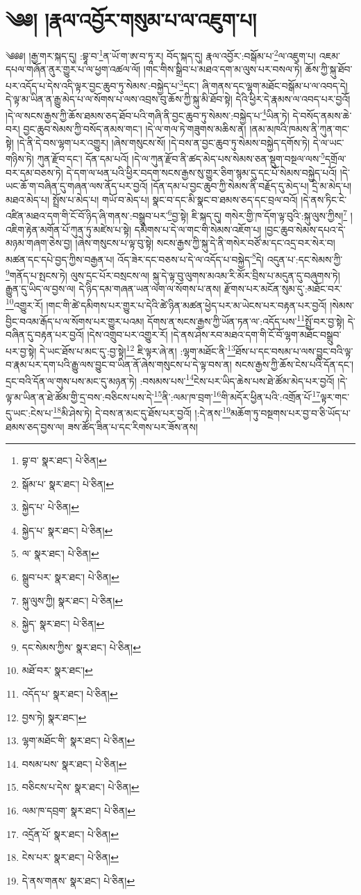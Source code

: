 \setcounter{footnote}{0} 
\chapter{༄༅། །རྣལ་འབྱོར་གསུམ་པ་ལ་འཇུག་པ།}༄༅༅། །རྒྱ་གར་སྐད་དུ། :བྷཱ་བ་\footnote{བྷ་བ་  སྣར་ཐང་།  པེ་ཅིན། }ན་ཡོ་ག་ཨ་བ་ཏཱ་ར། བོད་སྐད་དུ། རྣལ་འབྱོར་:བསྒོམ་པ་\footnote{སྒོམ་པ་  སྣར་ཐང་།  པེ་ཅིན། }ལ་འཇུག་པ། འཇམ་དཔལ་གཞོན་ནུར་གྱུར་པ་ལ་ཕྱག་འཚལ་ལོ། །གང་གིས་སྒྲིབ་པ་མཐའ་དག་མ་ལུས་པར་བསལ་ཏེ། ཆོས་ཀྱི་སྐུ་ཐོབ་པར་འདོད་པ་དེས་འདི་ལྟར་བྱང་ཆུབ་ཏུ་སེམས་:བསྐྱེད་པ་\footnote{སྐྱེད་པ་  པེ་ཅིན། }དང་། ཞི་གནས་དང་ལྷག་མཐོང་བསྒོམ་པ་ལ་འབད་དེ། དེ་ལྟ་མ་ཡིན་ན་རྒྱུ་མེད་པ་ལ་སོགས་པ་ལས་འབྲས་བུ་ཆོས་ཀྱི་སྐུ་མི་ཐོབ་སྟེ། དེའི་ཕྱིར་དེ་རྣམས་ལ་འབད་པར་བྱའོ། །དེ་ལ་སངས་རྒྱས་ཀྱི་ཆོས་ཐམས་ཅད་ཐོབ་པའི་གཞི་ནི་བྱང་ཆུབ་ཏུ་སེམས་:བསྐྱེད་པ་\footnote{སྐྱེད་པ་  སྣར་ཐང་།  པེ་ཅིན། }ཡིན་ཏེ། དེ་བསོད་ནམས་ཆེ་བར། བྱང་ཆུབ་སེམས་ཀྱི་བསོད་ནམས་གང་། །དེ་ལ་གལ་ཏེ་གཟུགས་མཆིས་ན། །ནམ་མཁའི་ཁམས་ནི་ཀུན་གང་སྟེ། །དེ་ནི་དེ་བས་ལྷག་པར་འགྱུར། །ཞེས་གསུངས་སོ། །དེ་བས་ན་བྱང་ཆུབ་ཏུ་སེམས་བསྐྱེད་དགོས་ཏེ། དེ་ལ་ཡང་གཉིས་ཏེ། ཀུན་རྫོབ་དང་། དོན་དམ་པའོ། །དེ་ལ་ཀུན་རྫོབ་ནི་ཚད་མེད་པས་སེམས་ཅན་སྡུག་བསྔལ་ལས་\footnote{ལ་  སྣར་ཐང་།  པེ་ཅིན། }དགྲོལ་བར་དམ་བཅས་ཏེ། དེ་དག་ལ་ཕན་པའི་ཕྱིར་བདག་སངས་རྒྱས་སུ་གྱུར་ཅིག་སྙམ་དུ་དང་པོ་སེམས་བསྐྱེད་པའོ། །དེ་ཡང་ཆོ་ག་བཞིན་དུ་གཞན་ལས་ནོད་པར་བྱའོ། །དོན་དམ་པ་བྱང་ཆུབ་ཀྱི་སེམས་ནི་བརྗོད་དུ་མེད་པ། དྲི་མ་མེད་པ། མཐའ་མེད་པ། སྤྲོས་པ་མེད་པ། གཡོ་བ་མེད་པ། སྣང་བ་དང་མི་སྣང་བ་ཐམས་ཅད་དང་བྲལ་བའོ། །དེ་ནས་ཏིང་ངེ་འཛིན་མཐའ་དག་གི་ངོ་བོ་ཉིད་ཞི་གནས་:བསྒྲུབ་པར་\footnote{སྒྲུབ་པར་  སྣར་ཐང་།  པེ་ཅིན། }བྱ་སྟེ། ཇི་སྐད་དུ། གསེར་གྱི་ཁ་དོག་ལྟ་བུའི་:སྐུ་ལུས་ཀྱིས།\footnote{སྐུ་ལུས་ཀྱི།  སྣར་ཐང་།  པེ་ཅིན། } །འཇིག་རྟེན་མགོན་པོ་ཀུན་ཏུ་མཛེས་པ་སྟེ། དམིགས་པ་དེ་ལ་གང་གི་སེམས་འཇོག་པ། །བྱང་ཆུབ་སེམས་དཔའ་དེ་མཉམ་གཞག་ཅེས་བྱ། །ཞེས་གསུངས་པ་ལྟ་བུ་སྟེ། སངས་རྒྱས་ཀྱི་སྐུ་དེ་ནི་གསེར་བཙོ་མ་དང་འདྲ་བར་སེར་བ། མཚན་དང་དཔེ་བྱད་ཀྱིས་བརྒྱན་པ། འོད་ཟེར་དང་བཅས་པ་དེ་ལ་འདོད་པ་བསྐྱེད་\footnote{སྐྱེད་  སྣར་ཐང་།  པེ་ཅིན། }དེ། འདུན་པ་:དང་སེམས་ཀྱི་\footnote{དང་སེམས་ཀྱིས་  སྣར་ཐང་།  པེ་ཅིན། }གནོད་པ་སྤངས་ཏེ། ལུས་དྲང་པོར་བསྲངས་ལ། སྐུ་དེ་ལྟ་བུ་ལུགས་མའམ་རི་མོར་བྲིས་པ་མདུན་དུ་བཞུགས་ཏེ། རྒྱུན་དུ་ཡིད་ལ་བྱས་ལ། དེ་ཉིད་དམ་གཞན་ཡན་ལག་ལ་སོགས་པ་ནས། རྫོགས་པར་མངོན་སུམ་དུ་:མཐོང་བར་\footnote{མཐོ་བར་  སྣར་ཐང་། }འགྱུར་རོ། །གང་གི་ཚེ་དམིགས་པར་གྱུར་པ་དེའི་ཚེ་ཉིན་མཚན་ཕྱེད་པར་མ་ཡེངས་པར་བརྟན་པར་བྱའོ། །སེམས་བྱིང་བའམ་རྒོད་པ་ལ་སོགས་པར་གྱུར་པའམ། དོགས་ན་སངས་རྒྱས་ཀྱི་ཡོན་ཏན་ལ་:འདོད་པས་\footnote{འདོད་པ་  སྣར་ཐང་།  པེ་ཅིན། }སྤྲོ་བར་བྱ་སྟེ། དེ་བཞིན་དུ་བརྟན་པར་བྱའོ། །དེས་འགྲུབ་པར་འགྱུར་རོ། །དེ་ནས་ཤེས་རབ་མཐའ་དག་གི་ངོ་བོ་ལྷག་མཐོང་བསྒྲུབ་པར་བྱ་སྟེ། དེ་ཡང་ཐོས་པ་མང་དུ་:བྱ་སྟེ།\footnote{བྱས་ཏེ།  སྣར་ཐང་། } ཇི་ལྟར་ཞེ་ན། :ལྷག་མཐོང་ནི་\footnote{ལྷག་མཐོང་གི་  སྣར་ཐང་།  པེ་ཅིན། }ཐོས་པ་དང་བསམ་པ་ལས་བྱུང་བའི་ལྟ་བ་རྣམ་པར་དག་པའི་རྒྱུ་ལས་བྱུང་བ་ཡིན་ནོ་ཞེས་གསུངས་པ་དེ་ལྟ་བས་ན། སངས་རྒྱས་ཀྱི་ཆོས་ངེས་པའི་དོན་དང་། དྲང་བའི་དོན་ལ་གུས་པས་མང་དུ་མཉན་ཏེ། :བསམས་པས་\footnote{བསམ་པས་  སྣར་ཐང་།  པེ་ཅིན། }ངེས་པར་ཡིད་ཆེས་པས་ཐེ་ཚོམ་མེད་པར་བྱའོ། །དེ་ལྟ་མ་ཡིན་ན་ཐེ་ཚོམ་གྱི་དྲ་བས་:བཅིངས་པས་དེ་\footnote{བཅིངས་པ་དེས་  སྣར་ཐང་།  པེ་ཅིན། }ནི་:ལམ་ཁ་བྲག་\footnote{ལམ་ཁ་དབྲག་  སྣར་ཐང་།  པེ་ཅིན། }གི་མདོར་ཕྱིན་པའི་:འགྲོན་པོ་\footnote{འདྲོན་པོ་  སྣར་ཐང་།  པེ་ཅིན། }ལྟར་གང་དུ་ཡང་:ངེས་པ་\footnote{ངེས་པར་  སྣར་ཐང་།  པེ་ཅིན། }མི་ཤེས་ཏེ། དེ་བས་ན་མང་དུ་ཐོས་པར་བྱའོ། །:དེ་ནས་\footnote{དེ་ནས་གནས་  སྣར་ཐང་།  པེ་ཅིན། }མཆོག་ཏུ་བསྔགས་པར་བྱ་བ་ཅི་ཡོད་པ་ཐམས་ཅད་བྱས་ལ། ཟས་ཚོད་ཟིན་པ་དང་རིགས་པར་ཟོས་ནས། 